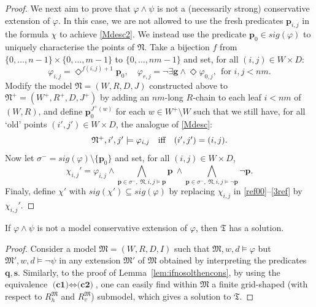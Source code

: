 \documentclass{lmcs} %
\theoremstyle{plain}\newtheorem{satz}[thm]{Satz} %
\newcommand{\sig}{\mathit{sig}}
\newcommand{\tiling}{\mathfrak T}
\newcommand{\ssvar}{\fform{s}}
\newcommand{\fform}[1]{\boldsymbol{#1}}
\newcommand{\pvar}{\fform{p}}
\newcommand{\qvar}{\fform{q}}
\newcommand{\gvar}{\fform{g}}
\newcommand{\Dv}{\exists}
\newcommand{\Dh}{\Diamond}
\begin{document}
\begin{proof}
		We next aim to prove that $\varphi\land\psi$ is not a (necessarily strong) conservative extension of $\varphi$. In this case, we are not allowed to use the fresh predicates 
		$\pvar_{i,j}$ in the formula $\chi$ to achieve \eqref{Mdesc2}.
		We instead  use the predicate $\pvar_0\in\sig(\varphi)$ to uniquely characterise the points of $\mathfrak N$.
		Take a bijection $f$ from $\{0,\ldots,n-1\}\times \{0,\ldots,m-1\}$ to $\{0,\ldots,nm-1\}$ and 
		set, for all $(i,j)\in W\times D$:
		\[ 
		\varphi_{i,j}=\Dh^{f(i,j)+1}\pvar_0,\quad \varphi_{r,j}=\neg \Dv \gvar \wedge \Dh \varphi_{0,j},\ \ 
		\mbox{for $i,j<nm$.}
		\]
		Modify the model $\mathfrak N=(W,R,D,J)$ constructed above to $\mathfrak N^+=(W^+,R^+,D,J^+)$ by adding an $nm$-long $R$-chain to each
		leaf $i<nm$ of $(W,R)$, and define $\pvar_0^{J^+(w)}$ for each $w\in W^+\setminus W$ such that we still have, for all `old' points $(i',j')\in W\times D$, the analogue of \eqref{Mdesc}:
			\[
			\mbox{$\mathfrak N^+,i',j'\models \varphi_{i,j}$\quad iff\quad $(i',j')=(i,j)$.}
		\]
		Now let $\sigma^-=\sig(\varphi)\setminus\{\pvar_0\}$ and set, for all $(i,j)\in W\times D$,
			\[
			\chi_{i,j}' = \varphi_{i,j}\land\bigwedge_{\pvar\in\sigma^-,\ \mathfrak N,i,j\models \pvar}\pvar\  \land
			\bigwedge_{\pvar\in\sigma^-,\ \mathfrak N,i,j\models \neg\pvar}\neg\pvar.
		\]
		Finaly, define $\chi'$ with $\sig(\chi')\subseteq\sig(\varphi)$ by replacing $\chi_{i,j}$ in \eqref{ref00}--\eqref{3ref} by $\chi_{i,j}'$.	
	\end{proof}
	
	\begin{lem}\label{lem:ifnosolthencons2}
		If $\varphi \wedge \psi$ is not a model conservative extension of $\varphi$, then $\tiling$ has a solution.
	\end{lem}
	\begin{proof}
		Consider a model $\mathfrak{M}=(W,R,D,I)$ such that $\mathfrak{M},w,d\models \varphi$ but 
		$\mathfrak{M}',w,d\models \neg\psi$
		in any extension $\mathfrak M'$ of $\mathfrak{M}$ obtained by interpreting the predicates $\qvar,\ssvar$.
		Similarly, to the proof of Lemma~\ref{lem:ifnosolthencons}, 
		by using the equivalence $\textbf{(c1)} \Leftrightarrow \textbf{(c2)}$, one can easily find within $\mathfrak{M}$ a finite grid-shaped (with respect to $R_{h}^\mathfrak M$ and 
		$R_{v}^\mathfrak M$) submodel, which gives a solution to $\tiling$.
	\end{proof}
	
\end{document}
